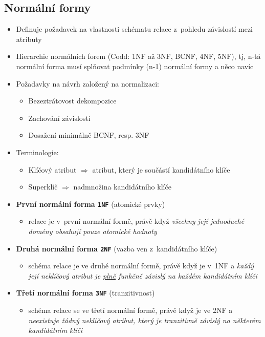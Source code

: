 \documentclass[a4paper,10pt]{article}
\newcommand{\tedy}{$\Rightarrow$ }
\begin{document}
    \subsection{Normální formy}
      \begin{itemize}
        \item Definuje požadavek na vlastnosti schématu relace z~pohledu závislostí mezi atributy
        \item Hierarchie normálních forem (Codd: 1NF až 3NF, BCNF, 4NF, 5NF), tj, n-tá normální forma musí splňovat podmínky (n-1) normální formy a něco navíc
        \item Požadavky na návrh založený na normalizaci:
        \begin{itemize}
          \item Bezeztrátovost dekompozice
          \item Zachování závislostí
          \item Dosažení minimálně BCNF, resp. 3NF
        \end{itemize}
        \item Terminologie:
        \begin{itemize}
          \item Klíčový atribut \tedy atribut, který je součástí kandidátního klíče
          \item Superklíč \tedy nadmnožina kandidátního klíče
        \end{itemize}

        \item \textbf{První normální forma \texttt{1NF}} \hfill {\small (atomické prvky)}
        \begin{itemize}
          \item relace je v~první normální formě, právě když \emph{všechny její jednoduché domény obsahují pouze atomické hodnoty}
        \end{itemize}

        \item \textbf{Druhá normální forma \texttt{2NF}} \hfill {\small (vazba ven z~kandidátního klíče)}
        \begin{itemize}
          \item schéma relace je ve druhé normální formě, právě když je v~1NF a \emph{každý její neklíčový atribut je \underline{plně} funkčně závislý na každém kandidátním klíči}
        \end{itemize}

        \item \textbf{Třetí normální forma \texttt{3NF}} \hfill {\small (tranzitivnost)}
        \begin{itemize}
          \item schéma relace se ve třetí normální formě, právě když je ve 2NF a \emph{neexistuje žádný neklíčový atribut, který je tranzitivně závislý na některém kandidátním klíči}
        \end{itemize}


\end{itemize}
\end{document}
